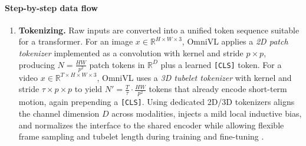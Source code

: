 \begin{enrichment}
\begin{enrichment}
        \paragraph{Step-by-step data flow}
        \begin{enumerate}
            \item \textbf{Tokenizing.} Raw inputs are converted into a unified token sequence suitable for a transformer. For an image \(x\!\in\!\mathbb{R}^{H\times W\times 3}\), OmniVL applies a \emph{2D patch tokenizer} implemented as a convolution with kernel and stride \(p\times p\), producing \(N=\tfrac{HW}{p^2}\) patch tokens in \(\mathbb{R}^{D}\) plus a learned \texttt{[CLS]} token. For a video \(x\!\in\!\mathbb{R}^{T\times H\times W\times 3}\), OmniVL uses a \emph{3D tubelet tokenizer} with kernel and stride \(\tau\times p\times p\) to yield \(N'=\tfrac{T}{\tau}\cdot\tfrac{HW}{p^2}\) tokens that already encode short-term motion, again prepending a \texttt{[CLS]}. Using dedicated 2D/3D tokenizers aligns the channel dimension \(D\) across modalities, injects a mild local inductive bias, and normalizes the interface to the shared encoder while allowing flexible frame sampling and tubelet length during training and fine-tuning \cite{wang2022_omnivl}. 
            

\end{enumerate}
\end{enrichment}
\end{enrichment}
